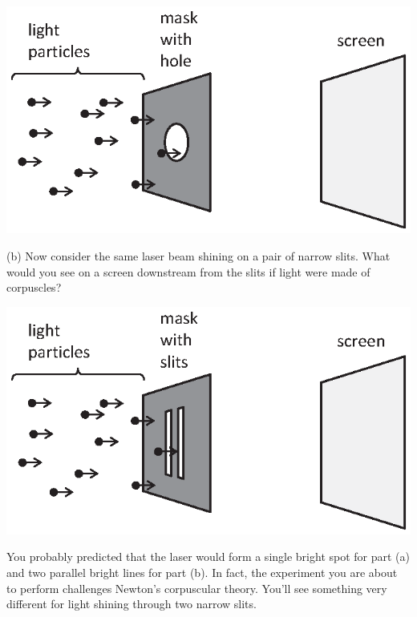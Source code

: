 {\centering \includegraphics[scale=0.85]{interference_of_light/circular_hole.eps} \par}


(b) Now consider the same laser beam shining on a pair of narrow slits.
What would you see on a screen downstream from the slits if light
were made of corpuscles?

{\centering \includegraphics[scale=0.85]{interference_of_light/particles_two_slits.eps} \par}

You probably predicted that the laser would
form a single bright spot for part (a) and two parallel bright lines for part
(b).  In fact, the experiment you are about to perform challenges Newton's corpuscular theory. 
You'll see something very different for light shining through two narrow slits.


